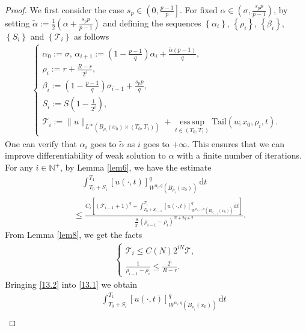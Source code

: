 \documentclass[reqno,10pt]{amsart}
\numberwithin{equation}{section}
\begin{document}
\begin{proof}
	We first consider the case $s_p\in \left( 0,\frac{p-1}{p}\right] $. For fixed $\alpha\in \left(\sigma,\frac{s_pp}{p-1} \right)$, by setting $\tilde{\alpha}:=\frac{1}{2}\left( \alpha+\frac{s_pp}{p-1}\right) $ and defining the sequences $\left\lbrace\alpha_i\right\rbrace $, $\left\lbrace\rho_i\right\rbrace $, $\left\lbrace\beta_i\right\rbrace $, $\left\lbrace S_i\right\rbrace $ and $\left\lbrace\mathcal{T}_i\right\rbrace$ as follows
	\begin{align*}
		\begin{cases}
			\alpha_0:=\sigma,\,\alpha_{i+1}:=\left( 1-\frac{p-1}{q}\right)\alpha_i+\frac{\tilde{\alpha}(p-1)}{q},\\
			\rho_i:=r+\frac{R-r}{2^i},\\
			\beta_i:=\left( 1-\frac{p-1}{q}\right)\sigma_{i-1}+\frac{s_pp}{q},\\
			S_i:=S\left(1-\frac{1}{2^i}\right),\\
			\mathcal{T}_i:=\|u\|_{L^\infty\left(B_{\rho_i}(x_0)\times(T_0,T_1)\right)}+\operatorname*{ess\,sup}\limits_{t\in(T_0,T_1)}\mathrm{Tail}\left(u;x_0,\rho_i,t\right).   
		\end{cases}
	\end{align*}
	One can verify that $\alpha_i$ goes to $\tilde{\alpha}$ as $i$ goes to $+\infty$. This ensures that we can improve differentiability of weak solution to $\alpha$ with a finite number of iterations. For any $i\in\mathbb{N}^+$, by Lemma \ref{lem6}, we have the estimate
	\begin{align}
		\label{13.1}
	&\quad	\int_{T_0+S_i}^{T_1}[u(\cdot,t)]^q_{W^{\alpha_i,q}(B_{\rho_i}(x_0))}\,\mathrm{d}t \nonumber\\
		&\le\frac{C_i\left[\left(\mathcal{T}_{i-1}+1\right)^q+\int_{T_0+S_{i-1}}^{T_1}[u(\cdot,t)]^q_{W^{\alpha_{i-1},q}\left( B_{\rho_{i-1}}(x_0)\right)}\mathrm{d}t\right]}{\frac{S}{2^i}(\rho_{i-1}-\rho_i)^{N+2q+2}}.
	\end{align}
	From Lemma \ref{lem8}, we get the facts
	\begin{align}
		\label{13.2}
		\begin{cases}
			\mathcal{T}_i\le C(N)2^{iN}\mathcal{T},\\
			\frac{1}{\rho_{i-1}-\rho_i}\le \frac{2^i}{R-r}.
		\end{cases}
	\end{align}
	Bringing \eqref{13.2} into \eqref{13.1} we obtain
	\begin{align}
		\label{13.3}
		&\quad\int_{T_0+S_i}^{T_1}[u(\cdot,t)]^q_{W^{\alpha_i,q}(B_{\rho_i}(x_0))}\,\mathrm{d}t\nonumber\\

\end{align}
\end{proof}
\end{document}
